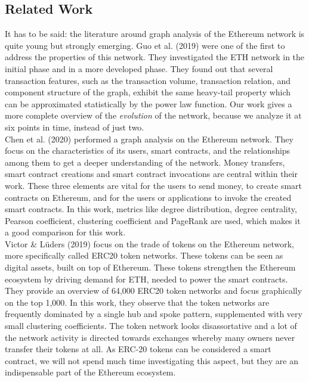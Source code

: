 \documentclass[10pt,a4paper]{article}
\begin{document}
\begin{multicols}{2}
\section{Related Work}
It has to be said: the literature around graph analysis of the Ethereum network is quite young but strongly emerging. Guo et al. (2019) \cite{GUO201958} were one of the first to address the properties of this network. They investigated the ETH network in the initial phase and in a more developed phase. They found out that several transaction features, such as the transaction volume, transaction relation, and component structure of the graph, exhibit the same heavy-tail property which can be approximated statistically by the power law function. Our work gives a more complete overview of the \textit{evolution} of the network, because we analyze it at six points in time, instead of just two.\\
Chen et al. (2020) \cite{chenEthereum} performed a graph analysis on the Ethereum network. They focus on the characteristics of its users, smart contracts, and the relationships among them to get a deeper understanding of the network. Money transfers, smart contract creations and smart contract invocations are central within their work. These three elements are vital for the users to send money, to create smart contracts on Ethereum, and for the users or applications to invoke the created smart contracts. In this work, metrics like degree distribution, degree centrality, Pearson coefficient, clustering coefficient and PageRank are used, which makes it a good comparison for this work.\\
Victor \& Lüders (2019) \cite{inbook} focus on the trade of tokens on the Ethereum network, more specifically called ERC20 token networks. These tokens can be seen as digital assets, built on top of Ethereum. These tokens strengthen the Ethereum ecosystem by driving demand for ETH, needed to power the smart contracts. They provide an overview of 64,000 ERC20 token networks and focus graphically on the top 1,000. In this work, they observe that the token networks are frequently dominated by a single hub and spoke pattern, supplemented with very small clustering coefficients. The token network looks disassortative and a lot of the network activity is directed towards exchanges whereby many owners never transfer their tokens at all. As ERC-20 tokens can be considered a smart contract, we will not spend much time investigating this aspect, but they are an indispensable part of the Ethereum ecosystem.



\end{multicols}
\end{document}
